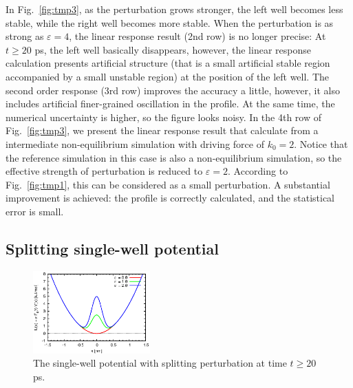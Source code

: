 \documentclass[aip,jcp,a4paper,reprint,onecolumn]{revtex4-1}
\newcommand{\eps}{\varepsilon}
\begin{document}
In Fig.~\ref{fig:tmp3}, as the
perturbation grows stronger, the left well becomes less stable, while
the right well becomes more stable.  When the perturbation is as strong as
$\eps = 4$, the linear response result (2nd row) is no
longer precise:
At $t\geq 20$ \textsf{ps}, the left well basically
disappears, however, the linear response calculation presents
artificial structure (that is a small artificial
stable region accompanied by a small unstable region)
at the position of the left well.
The second order response (3rd row) improves the accuracy a little, 
however, it also includes artificial finer-grained oscillation in the profile.
At the same time, the numerical uncertainty is higher, so the figure
looks noisy.
In the 4th row of Fig.~\ref{fig:tmp3}, we present the linear response result
that calculate from 
a intermediate
non-equilibrium simulation with driving force of $k_0 = 2$.
Notice that the reference simulation in this case is also a
non-equilibrium simulation, so the effective strength of perturbation
is reduced to $\eps = 2$. According to Fig.~\ref{fig:tmp1}, this can be
considered as a small perturbation.
A substantial improvement is achieved: the profile
is correctly calculated, and the statistical error is small.



\subsection{Splitting single-well potential}

\begin{figure}
  \centering
  \includegraphics[width=0.4\textwidth]{figs/fig-split-pot.eps}
  \caption{The single-well potential with splitting perturbation at
    time $t\geq 20$ ps.}
  \label{fig:tmp4}
\end{figure}
\end{document}
